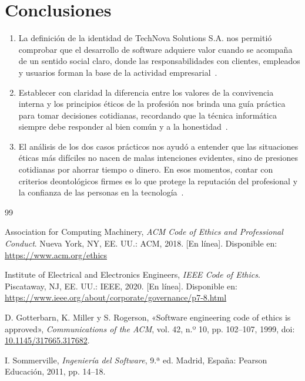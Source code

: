 \documentclass[12pt,a4paper,oneside]{article}
\begin{document}
\section{Conclusiones}
\begin{enumerate}[leftmargin=1.8em,itemsep=3pt]
    \item La definición de la identidad de TechNova Solutions S.A. nos permitió comprobar que el desarrollo de software adquiere valor cuando se acompaña de un sentido social claro, donde las responsabilidades con clientes, empleados y usuarios forman la base de la actividad empresarial~\cite{sommerville2011}.
    \item Establecer con claridad la diferencia entre los valores de la convivencia interna y los principios éticos de la profesión nos brinda una guía práctica para tomar decisiones cotidianas, recordando que la técnica informática siempre debe responder al bien común y a la honestidad~\cite{acm2018,gotterbarn2001}.
    \item El análisis de los dos casos prácticos nos ayudó a entender que las situaciones éticas más difíciles no nacen de malas intenciones evidentes, sino de presiones cotidianas por ahorrar tiempo o dinero. En esos momentos, contar con criterios deontológicos firmes es lo que protege la reputación del profesional y la confianza de las personas en la tecnología~\cite{ieee2020}.
\end{enumerate}

\clearpage
\renewcommand{\refname}{Referencias Bibliográficas}
\begin{thebibliography}{99}

Association for Computing Machinery, \textit{ACM Code of Ethics and Professional Conduct}. Nueva York, NY, EE. UU.: ACM, 2018. [En línea]. Disponible en: \url{https://www.acm.org/ethics}

Institute of Electrical and Electronics Engineers, \textit{IEEE Code of Ethics}. Piscataway, NJ, EE. UU.: IEEE, 2020. [En línea]. Disponible en: \url{https://www.ieee.org/about/corporate/governance/p7-8.html}

D. Gotterbarn, K. Miller y S. Rogerson, «Software engineering code of ethics is approved», \textit{Communications of the ACM}, vol. 42, n.º 10, pp. 102--107, 1999, doi: \href{https://doi.org/10.1145/317665.317682}{10.1145/317665.317682}.

I. Sommerville, \textit{Ingeniería del Software}, 9.ª ed. Madrid, España: Pearson Educación, 2011, pp. 14--18.

\end{thebibliography}
\end{document}
